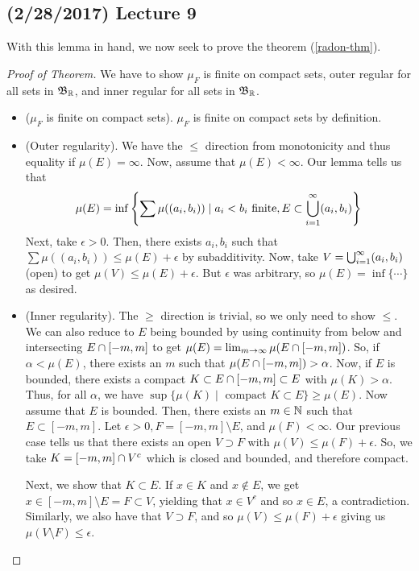 \documentclass[11pt,leqno,oneside]{amsbook}
\numberwithin{thm}{section}
\begin{document}
  \subsection*{(2/28/2017) Lecture 9}
  With this lemma in hand, we now seek to prove the theorem (\ref{radon-thm}).
  \begin{proof}[Proof of Theorem]
    We have to show $\mu_F$ is finite on compact sets, outer
    regular for all sets in $\mathfrak{B}_{\mathbb R}$, and inner regular for all sets in
    $\mathfrak{B}_{\mathbb R}$.
    \begin{itemize}
    \item ($\mu_F$ is finite on compact sets).
      $\mu_F$ is finite on compact sets by definition.
    \item (Outer regularity). We have the $\leq$ direction from
      monotonicity and thus equality if $\mu(E) = \infty$. Now, assume
      that $\mu(E) < \infty$. Our lemma tells us that \[
        \mu(E) = \inf \left\{ \sum \mu((a_i,b_i)) \mid a_i < b_i
          \text{ finite}, E \subset \bigcup_{i=1}^\infty (a_i,b_i) \right\}
      \]
      Next, take $\epsilon > 0$. Then, there exists $a_i,b_i$ such
      that $\sum \mu((a_i,b_i)) \leq \mu(E) +\epsilon$ by
      subadditivity. Now, take $V = \bigcup_{i=1}^\infty (a_i,b_i)$
      (open) to get $\mu(V) \leq \mu(E) + \epsilon$. But $\epsilon$
      was arbitrary, so $\mu(E) = \inf\{ \cdots \}$ as desired.
    \item (Inner regularity). The $\geq$ direction is trivial, so we
      only need to show $\leq$. We can also reduce to $E$ being
      bounded by using continuity from below and intersecting $E
      \cap [-m,m]$ to get $\mu(E) = \lim_{m \to \infty} \mu(E
      \cap [-m,m])$. So, if $\alpha < \mu(E)$, there exists an
      $m$ such that $\mu(E \cap [-m,m]) > \alpha$. Now, if $E$
      is bounded, there exists a
      compact $K \subset E \cap [-m,m] \subset E$ with $\mu(K) >
      \alpha$. Thus, for all $\alpha$, we have $\sup \{\mu(K)
      \mid \text{ compact }K \subset E\} \geq \mu(E)$. Now assume that
      $E$ is bounded. Then, there exists an $m \in {\mathbb N}$ such that $E
      \subset [-m,m]$. Let $\epsilon > 0, F = [-m,m] \setminus E$, and
      $\mu(F) < \infty$. Our previous case tells us that there exists
      an open $V \supset F$  with $\mu(V) \leq \mu(F) + \epsilon$. So,
      we take $K = [-m,m] \cap V^c$ which is closed and bounded,
      and therefore compact.

      Next, we show that $K
      \subset E$. If $x \in K$ and $x \not \in E$, we get $x \in
      [-m,m] \setminus E = F \subset V$, yielding that $x \in V^c$ and
      so $x \in E$, a contradiction. Similarly, we also have that $V
      \supset F$, and so $\mu(V) \leq \mu(F) + \epsilon$ giving us
      $\mu(V \setminus F) \leq \epsilon$.


\end{itemize}
\end{proof}
\end{document}

